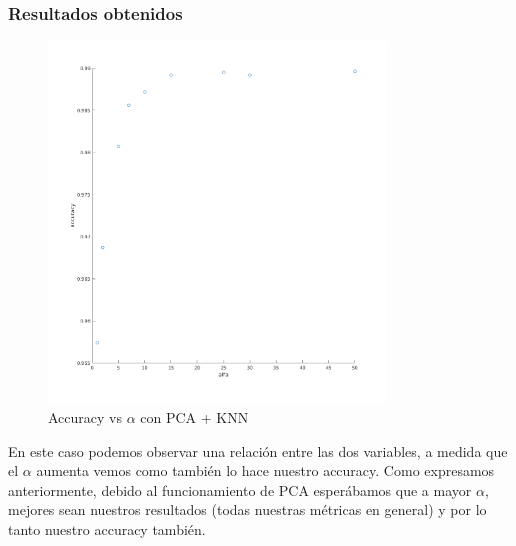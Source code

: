 \subsubsection*{Resultados obtenidos}

\begin{figure}[H]
	\centering	\includegraphics[width=0.8\textwidth]{img/alfa_pca_accu.png}
	\caption{Accuracy vs $\alpha$ con PCA + KNN}
	\label{fig:Accuracy vs Alpha con KNN + PCA}
\end{figure}

En este caso podemos observar una relación entre las dos variables, a medida que el $\alpha$ aumenta vemos como también lo hace nuestro accuracy.
Como expresamos anteriormente, debido al funcionamiento de PCA esperábamos que a mayor $\alpha$, mejores sean nuestros resultados (todas nuestras métricas en general) y por lo tanto nuestro accuracy también.

